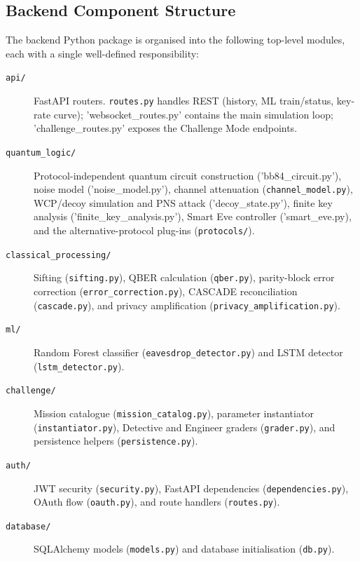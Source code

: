 \documentclass[12pt, a4paper]{article}
\begin{document}
\subsection{Backend Component Structure}
\label{sec:backend-structure}

The backend Python package is organised into the following top-level
modules, each with a single well-defined responsibility:

\begin{description}
  \item[\texttt{api/}] FastAPI routers. \texttt{routes.py} handles REST
        (history, ML train/status, key-rate curve); 'websocket\_routes.py'
        contains the main simulation loop; 'challenge\_routes.py'
        exposes the Challenge Mode endpoints.
  \item[\texttt{quantum\_logic/}] Protocol-independent quantum circuit
        construction ('bb84\_circuit.py'), noise model
        ('noise\_model.py'), channel attenuation
        (\texttt{channel\_model.py}), WCP/decoy simulation and PNS attack
        ('decoy\_state.py'), finite key analysis
        ('finite\_key\_analysis.py'), Smart Eve controller
        ('smart\_eve.py), and the alternative-protocol plug-ins
        (\texttt{protocols/}).
  \item[\texttt{classical\_processing/}] Sifting (\texttt{sifting.py}),
        QBER calculation (\texttt{qber.py}), parity-block error correction
        (\texttt{error\_correction.py}), CASCADE reconciliation
        (\texttt{cascade.py}), and privacy amplification
        (\texttt{privacy\_amplification.py}).
  \item[\texttt{ml/}] Random Forest classifier (\texttt{eavesdrop\_detector.py})
        and LSTM detector (\texttt{lstm\_detector.py}).
  \item[\texttt{challenge/}] Mission catalogue (\texttt{mission\_catalog.py}),
        parameter instantiator (\texttt{instantiator.py}), Detective and
        Engineer graders (\texttt{grader.py}), and persistence helpers
        (\texttt{persistence.py}).
  \item[\texttt{auth/}] JWT security (\texttt{security.py}), FastAPI
        dependencies (\texttt{dependencies.py}), OAuth flow
        (\texttt{oauth.py}), and route handlers (\texttt{routes.py}).
  \item[\texttt{database/}] SQLAlchemy models (\texttt{models.py}) and
        database initialisation (\texttt{db.py}).
\end{description}
\end{document}

